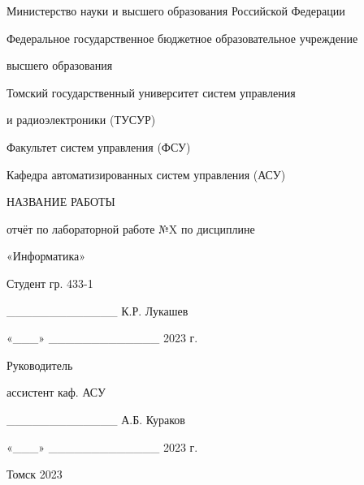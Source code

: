 \begin{titlepage}
\singlespacing
\fontsize{14pt}{1}\selectfont
\setlength{\parskip}{0pt}
\begin{center}

Министерство науки и высшего образования Российской Федерации

\vspace{14pt}

Федеральное государственное бюджетное образовательное учреждение

высшего образования

\vspace{14pt}

Томский государственный университет систем управления 

и радиоэлектроники (ТУСУР)

\vspace{14pt}

Факультет систем управления (ФСУ)

\vspace{14pt}

Кафедра автоматизированных систем управления (АСУ)

\fontsize{16pt}{1}\selectfont
{}

\vspace{16pt}
\vspace{16pt}
\vspace{16pt}

НАЗВАНИЕ РАБОТЫ

\vspace{16pt}

отчёт по лабораторной работе №X по дисциплине

«Информатика»

\vspace{16pt}
\vspace{16pt}
\vspace{16pt}
\vspace{16pt}
\vspace{16pt}
\vspace{16pt}

\end{center}

\justifying
\setlength{\parindent}{8cm}

Студент гр. 433-1

\_\_\_\_\_\_\_\_\_\_\_\_\_ К.Р. Лукашев

«\_\_\_» \_\_\_\_\_\_\_\_\_\_\_\_\_ 2023 г.

\vspace{16pt}
\vspace{16pt}

Руководитель 

ассистент каф. АСУ

\_\_\_\_\_\_\_\_\_\_\_\_\_ А.Б. Кураков

«\_\_\_» \_\_\_\_\_\_\_\_\_\_\_\_\_ 2023 г.

\begin{center}
\fontsize{16pt}{1}\selectfont
{}
\vfill

Томск 2023

\end{center}
\end{titlepage}

